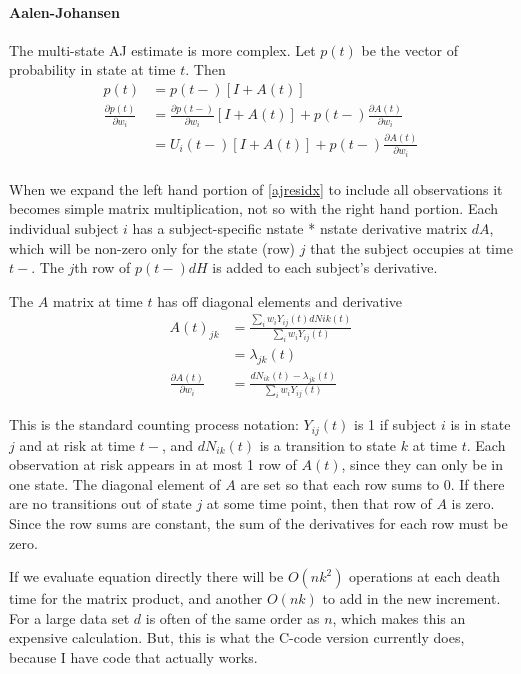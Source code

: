 \documentclass{article}
\begin{document}
\paragraph{Aalen-Johansen}
The multi-state AJ estimate is more complex.  Let $p(t)$ be the vector
of probability in state at time $t$.
Then
\begin{align}
  p(t) &= p(t-) [I+ A(t)]\nonumber\\
  \frac{\partial p(t)}{\partial w_i} &= \frac{\partial p(t-)}{\partial w_i} 
                                        [I+ A(t)]
     +  p(t-) \frac{\partial A(t)}{\partial w_i} \nonumber\\
   &= U_i(t-) [I+ A(t)] + p(t-) \frac{\partial A(t)}{\partial w_i} 
       \label{ajresidx}\\
\end{align}

When we expand the left hand portion of \eqref{ajresidx} to include all 
observations it becomes simple matrix multiplication, not so with
the right hand portion.
Each individual subject $i$ has a subject-specific
nstate * nstate derivative matrix $dA$, which will be non-zero only for the 
state (row) $j$ that the subject occupies at time $t-$. 
The $j$th row of $p(t-) dH$ is added to each subject's derivative.

The $A$ matrix at time $t$ has off diagonal elements and derivative
\begin{align}
A(t)_{jk} &= \frac{\sum_i w_i Y_{ij}(t) dN{ik}(t)}
     {\sum_i w_iY_{ij}(t)} \\
     &= \lambda_{jk}(t) \\
\frac{\partial A(t)}{\partial w_i} &= \frac{dN_{ik}(t) - \lambda_{jk}(t)}
     {\sum_i w_iY_{ij}(t)} \label{Aderiv}
\end{align}
    
This is the standard counting process notation: $Y_{ij}(t)$ is 1 if subject $i$
is in state $j$ and at risk at time $t-$, and $dN_{ik}(t)$ is a transition to
state $k$ at time $t$.
Each observation at risk appears in at most 1 row of $A(t)$, since they can
only be in one state.  
The diagonal element of $A$ are set so that each row sums to 0.
If there are no transitions out of state $j$ at some time point, then that
row of $A$ is zero.
Since the row sums are constant, the sum of the derivatives for each row
must be zero.

If we evaluate equation \label{ajresidx} directly there will be 
$O(nk^2)$ operations at each death time for the matrix product, and another
$O(nk)$  to add in the new increment.  For a large data set $d$ is often
of the same order as $n$, which makes this an expensive calculation.
But, this is what the C-code version currently does, because I have code that
actually works.
\end{document}
